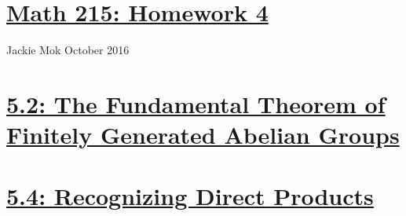\documentclass{article}
\begin{document}
\section*{\underline{Math 215: Homework 4}}
Jackie Mok
 October 2016

\section*{\underline{5.2: The Fundamental Theorem of Finitely Generated Abelian Groups}}





\section*{\underline{5.4: Recognizing Direct Products}}


\end{document}
